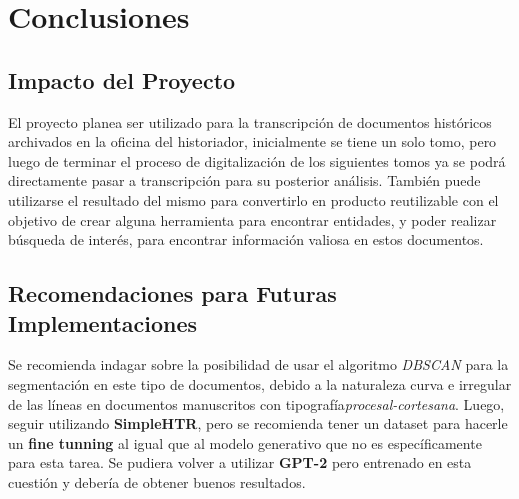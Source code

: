\documentclass[11pt,a4paper]{article}
\begin{document}
\section{Conclusiones} 
\subsection{Impacto del Proyecto} 

El proyecto planea ser utilizado para la transcripción de documentos hist\'oricos archivados en la oficina del historiador, inicialmente se tiene un solo tomo, pero luego de terminar el proceso de digitalizaci\'on de los siguientes tomos ya se podr\'a directamente pasar a transcripci\'on para su posterior an\'alisis. También puede utilizarse el resultado del mismo para convertirlo en producto reutilizable con el objetivo de crear alguna herramienta para encontrar entidades, y poder realizar búsqueda de interés, para encontrar información valiosa en estos documentos. 

\subsection{Recomendaciones para Futuras Implementaciones}
Se recomienda indagar sobre la posibilidad de usar el algoritmo \textit{DBSCAN} para la segmentación en este tipo de documentos, debido a la naturaleza curva e irregular de las líneas en documentos manuscritos con tipografía\textit{procesal-cortesana}. Luego, seguir utilizando \textbf{SimpleHTR}, pero se recomienda tener un dataset para hacerle un \textbf{fine tunning} al igual que al modelo generativo que no es espec\'ificamente para esta tarea. Se pudiera volver a utilizar \textbf{GPT-2} pero entrenado en esta cuesti\'on y debería de obtener buenos resultados.

 

\end{document}
